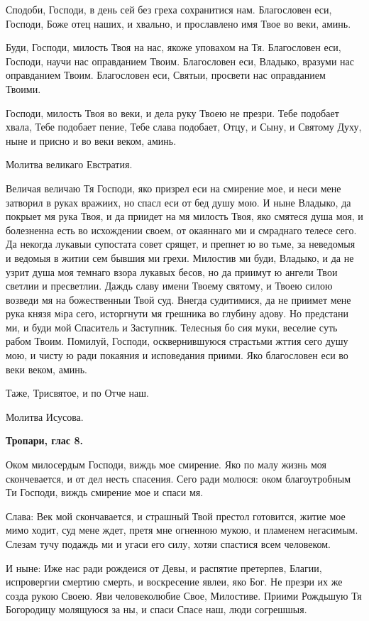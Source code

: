 Сподоби, Господи, в день сей без греха сохранитися нам. Благословен еси, Господи, Боже отец наших, и хвально, и прославлено имя Твое во веки, аминь.

Буди, Господи, милость Твоя на нас, якоже уповахом на Тя. Благословен еси, Господи, научи нас оправданием Твоим. Благословен еси, Владыко, вразуми нас оправданием Твоим. Благословен еси, Святыи, просвети нас оправданием Твоими.

Господи, милость Твоя во веки, и дела  руку Твоею не презри. Тебе подобает хвала, Тебе подобает пение, Тебе слава подобает, Отцу, и Сыну, и Святому Духу, ныне и присно и во веки веком, аминь.


Молитва великаго Евстратия.

Величая величаю Тя Господи, яко призрел еси на смирение мое, и неси мене затворил в руках вражиих, но спасл еси от бед душу мою. И ныне Владыко, да покрыет мя рука Твоя, и да приидет на мя милость Твоя, яко смятеся душа моя, и болезненна есть во исхождении своем, от окаяннаго ми и смраднаго телесе сего. Да некогда лукавыи супостата совет срящет, и препнет ю во тьме, за неведомыя и ведомыя в житии сем бывшия ми грехи. Милостив ми буди, Владыко, и да не узрит душа моя темнаго взора лукавых бесов, но да приимут ю ангели Твои светлии  и пресветлии. Даждь славу имени Твоему святому, и Твоею силою возведи мя на божественныи Твой суд. Внегда судитимися, да не приимет мене рука князя мiра сего, исторгнути мя грешника во глубину адову. Но предстани ми, и буди мой Спаситель и Заступник. Телесныя бо сия муки, веселие суть рабом Твоим. Помилуй, Господи, осквернившуюся страстьми жттия сего душу мою, и чисту ю ради покаяния и исповедания приими. Яко благословен еси во веки веком, аминь.


Таже, Трисвятое, и по Отче наш.

Молитва Исусова.


\medskip


\bfseries Тропари, глас 8.\normalfont{}


Оком милосердым Господи, виждь мое смирение. Яко по малу жизнь моя скончевается, и от дел несть спасения. Сего ради молюся: оком благоутробным Ти Господи, виждь смирение мое и спаси мя.

Слава: Век мой скончавается, и страшный Твой престол готовится, житие мое мимо ходит, суд мене ждет, претя мне огненною мукою, и пламенем негасимым. Слезам тучу подаждь ми и угаси его силу, хотяи спастися всем человеком.

И ныне: Иже нас ради рождеися от Девы, и распятие претерпев, Благии, испровергии смертию смерть, и воскресение явлеи, яко Бог. Не презри их же созда рукою Своею. Яви человеколюбие Свое, Милостиве. Приими Рождьшую Тя Богородицу молящуюся за ны, и спаси Спасе наш, люди согрешшыя.

